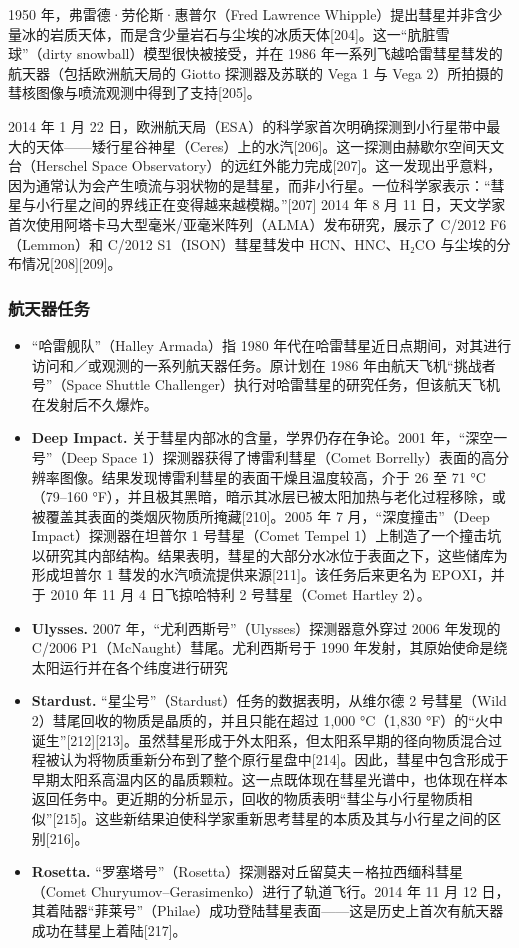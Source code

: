 1950 年，弗雷德·劳伦斯·惠普尔（Fred Lawrence Whipple）提出彗星并非含少量冰的岩质天体，而是含少量岩石与尘埃的冰质天体[204]。这一“肮脏雪球”（dirty snowball）模型很快被接受，并在 1986 年一系列飞越哈雷彗星彗发的航天器（包括欧洲航天局的 Giotto 探测器及苏联的 Vega 1 与 Vega 2）所拍摄的彗核图像与喷流观测中得到了支持[205]。

2014 年 1 月 22 日，欧洲航天局（ESA）的科学家首次明确探测到小行星带中最大的天体——矮行星谷神星（Ceres）上的水汽[206]。这一探测由赫歇尔空间天文台（Herschel Space Observatory）的远红外能力完成[207]。这一发现出乎意料，因为通常认为会产生喷流与羽状物的是彗星，而非小行星。一位科学家表示：“彗星与小行星之间的界线正在变得越来越模糊。”[207] 2014 年 8 月 11 日，天文学家首次使用阿塔卡马大型毫米/亚毫米阵列（ALMA）发布研究，展示了 C/2012 F6（Lemmon）和 C/2012 S1（ISON）彗星彗发中 HCN、HNC、H₂CO 与尘埃的分布情况[208][209]。
\subsubsection{航天器任务}  
\begin{itemize}
\item “哈雷舰队”（Halley Armada）指 1980 年代在哈雷彗星近日点期间，对其进行访问和／或观测的一系列航天器任务。原计划在 1986 年由航天飞机“挑战者号”（Space Shuttle Challenger）执行对哈雷彗星的研究任务，但该航天飞机在发射后不久爆炸。
\item \textbf{Deep Impact.} 关于彗星内部冰的含量，学界仍存在争论。2001 年，“深空一号”（Deep Space 1）探测器获得了博雷利彗星（Comet Borrelly）表面的高分辨率图像。结果发现博雷利彗星的表面干燥且温度较高，介于 26 至 71 °C（79–160 °F），并且极其黑暗，暗示其冰层已被太阳加热与老化过程移除，或被覆盖其表面的类烟灰物质所掩藏[210]。2005 年 7 月，“深度撞击”（Deep Impact）探测器在坦普尔 1 号彗星（Comet Tempel 1）上制造了一个撞击坑以研究其内部结构。结果表明，彗星的大部分水冰位于表面之下，这些储库为形成坦普尔 1 彗发的水汽喷流提供来源[211]。该任务后来更名为 EPOXI，并于 2010 年 11 月 4 日飞掠哈特利 2 号彗星（Comet Hartley 2）。
\item \textbf{Ulysses.} 2007 年，“尤利西斯号”（Ulysses）探测器意外穿过 2006 年发现的 C/2006 P1（McNaught）彗尾。尤利西斯号于 1990 年发射，其原始使命是绕太阳运行并在各个纬度进行研究
\item \textbf{Stardust.} “星尘号”（Stardust）任务的数据表明，从维尔德 2 号彗星（Wild 2）彗尾回收的物质是晶质的，并且只能在超过 1,000 °C（1,830 °F）的“火中诞生”[212][213]。虽然彗星形成于外太阳系，但太阳系早期的径向物质混合过程被认为将物质重新分布到了整个原行星盘中[214]。因此，彗星中包含形成于早期太阳系高温内区的晶质颗粒。这一点既体现在彗星光谱中，也体现在样本返回任务中。更近期的分析显示，回收的物质表明“彗尘与小行星物质相似”[215]。这些新结果迫使科学家重新思考彗星的本质及其与小行星之间的区别[216]。
\item \textbf{Rosetta.} “罗塞塔号”（Rosetta）探测器对丘留莫夫－格拉西缅科彗星（Comet Churyumov–Gerasimenko）进行了轨道飞行。2014 年 11 月 12 日，其着陆器“菲莱号”（Philae）成功登陆彗星表面——这是历史上首次有航天器成功在彗星上着陆[217]。
\end{itemize}
